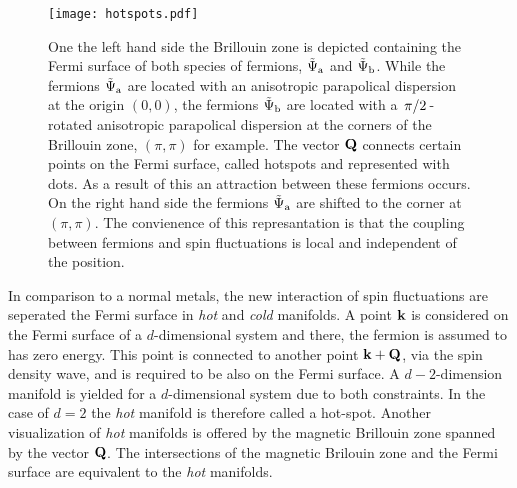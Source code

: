 %
\begin{figure}
	\centering
	\texttt{[image: hotspots.pdf]}
	\caption{
One the left hand side the Brillouin zone is depicted containing the Fermi surface of both species of fermions, $\tilde{\Psi}_{\mathrm{a}}$ and $\tilde{\Psi}_{\mathrm{b}}$.
While the fermions $\tilde{\Psi}_{\mathrm{a}}$ are located with an anisotropic parapolical dispersion at the origin $(0,0)$, the fermions $\tilde{\Psi}_{\mathrm{b}}$ are located with a $\flatfrac{\pi}{2}$-rotated anisotropic parapolical dispersion at the corners of the Brillouin zone, $(\pi,\pi)$ for example.
The vector $\vb{Q}$ connects certain points on the Fermi surface, called hotspots and represented with dots. 
As a result of this an attraction between these fermions occurs.
On the right hand side the fermions $\tilde{\Psi}_{\mathrm{a}}$ are shifted to the corner at $(\pi,\pi)$.
The convienence of this represantation is that the coupling between fermions and spin fluctuations is local and independent of the position.
	}
	\label{fig:hotspots}
\end{figure}
%
In comparison to a normal metals, the new interaction of spin fluctuations are seperated the Fermi surface in \emph{hot} and \emph{cold} manifolds.
A point $\vb{k}$ is considered on the Fermi surface of a $d$-dimensional system and there, the fermion is assumed to has zero energy.
This point is connected to another point $\vb{k}+\vb{Q}$, via the spin density wave, and is required to be also on the Fermi surface.
A $d-2$-dimension manifold is yielded for a $d$-dimensional system due to both constraints.
In the case of $d=2$ the \emph{hot} manifold is therefore called a hot-spot.
Another visualization of \emph{hot} manifolds is offered by the magnetic Brillouin zone spanned by the vector $\vb{Q}$.
The intersections of the magnetic Brilouin zone and the Fermi surface are equivalent to the \emph{hot} manifolds.

